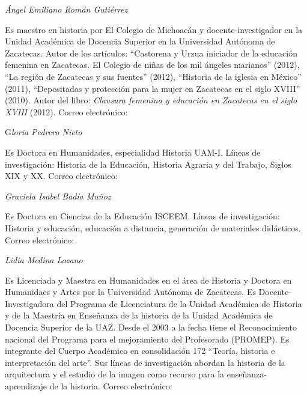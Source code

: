 \bigskip

{ 
\textit{Ángel Emiliano Román Gutiérrez }}

{ 
Es maestro en historia por El Colegio de Michoacán y docente-investigador en
la Unidad Académica de Docencia Superior en la Universidad Autónoma de
Zacatecas. Autor de los artículos: “Castorena y Urzua iniciador de la
educación femenina en Zacatecas. El Colegio de niñas de los mil ángeles
marianos” (2012), “La región de Zacatecas y sus fuentes”  (2012), “Historia
de la iglesia en México” (2011), “Depositadas y protección para la mujer en
Zacatecas en el siglo XVIII” (2010). Autor del libro: \textit{Clausura
femenina y educación en Zacatecas en el siglo XVIII} (2012).
 {Correo electrónico:
}\href{mailto:angelemiliano0724@hotmail.com}{}}


\bigskip

{ 
G\textit{loria Pedrero Nieto }}

{ 
Es Doctora en Humanidades, especialidad Historia UAM-I. Líneas de
investigación: Historia de la Educación, Historia Agraria y del Trabajo,
Siglos XIX y XX.  Correo electrónico:
\href{mailto:gpedrero@yahoo.com}{}\href{mailto:gpedrero@yahoo.com}{}\href{mailto:gpedrero@yahoo.com}{}}


\bigskip

{ 
\textit{Graciela Isabel Badía Muñoz}}

{ 
Es Doctora en Ciencias de la Educación ISCEEM. Líneas de investigación:
Historia y educación, educación a distancia, generación de materiales
didácticos. Correo electrónico:
\href{mailto:isabelbadia61@gmail.com}{}}


\bigskip

{ 
\textstyleInternetlink{\textit{\textcolor{black}{Rosa María Hernández
Ramírez}}}}

{ 
\textstyleInternetlink{\textcolor{black}{Es Maestra en Educación Superior.
Líneas de investigación, historia y educación, educación superior, 
política educativa. Correo electrónico:
}}\href{mailto:rosshr11896@yahoo.com.mx}{\textstyleInternetlink{\textcolor{black}{rosshr11896@yahoo.com.mx}}}}


\bigskip

{ 
\textit{ {Lidia Medina Lozano}}}

{ 
Es Licenciada y Maestra en Humanidades en el área de Historia y Doctora en
Humanidaes y Artes por la Universidad Autónoma de Zacatecas. Es
Docente-Investigadora del Programa de Licenciatura de la Unidad Académica
de Historia y de la Maestría en Enseñanza de la historia de la Unidad
Académica de Docencia Superior de la UAZ. Desde el 2003 a la fecha tiene el
Reconocimiento nacional del Programa para el mejoramiento del Profesorado
(PROMEP). Es integrante del Cuerpo Académico en consolidación 172  “Teoría,
historia e interpretación del arte”. Sus líneas de investigación abordan la
historia de la arquitectura y el estudio de la imagen como recurso para la
enseñanza-aprendizaje de la historia. Correo electrónico:
\href{mailto:liliu8@yahoo.com}{}}


